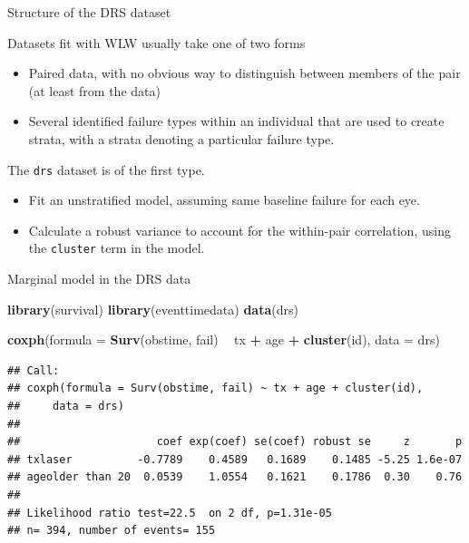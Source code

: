 \documentclass[ignorenonframetext,]{beamer}
\newenvironment{Shaded}{\begin{snugshade}}{\end{snugshade}}
\newcommand{\DataTypeTok}[1]{\textcolor[rgb]{0.13,0.29,0.53}{#1}}
\newcommand{\KeywordTok}[1]{\textcolor[rgb]{0.13,0.29,0.53}{\textbf{#1}}}
\newcommand{\NormalTok}[1]{#1}
\newcommand{\OperatorTok}[1]{\textcolor[rgb]{0.81,0.36,0.00}{\textbf{#1}}}
\newcommand{\StringTok}[1]{\textcolor[rgb]{0.31,0.60,0.02}{#1}}
\begin{document}
\begin{frame}{%
\protect\hypertarget{structure-of-the-drs-dataset}{%
Structure of the DRS dataset}}

Datasets fit with WLW usually take one of two forms

\begin{itemize}
\item
  Paired data, with no obvious way to distinguish between members of the
  pair (at least from the data)
\item
  Several identified failure types within an individual that are used to
  create strata, with a strata denoting a particular failure type.
\end{itemize}

The \texttt{drs} dataset is of the first type.

\begin{itemize}
\item
  Fit an unstratified model, assuming same baseline failure for each
  eye.
\item
  Calculate a robust variance to account for the within-pair
  correlation, using the \texttt{cluster} term in the model.
\end{itemize}

\end{frame}

\begin{frame}[fragile]{%
\protect\hypertarget{marginal-model-in-the-drs-data}{%
Marginal model in the DRS data}}

\scriptsize

\begin{Shaded}
\begin{Highlighting}[]
\KeywordTok{library}\NormalTok{(survival)}
\KeywordTok{library}\NormalTok{(eventtimedata)}
\KeywordTok{data}\NormalTok{(drs)}

\KeywordTok{coxph}\NormalTok{(}\DataTypeTok{formula =} \KeywordTok{Surv}\NormalTok{(obstime, fail) }\OperatorTok{~}\StringTok{ }\NormalTok{tx }\OperatorTok{+}\StringTok{ }\NormalTok{age }\OperatorTok{+}\StringTok{ }\KeywordTok{cluster}\NormalTok{(id),}
      \DataTypeTok{data =}\NormalTok{ drs)}
\end{Highlighting}
\end{Shaded}

\begin{verbatim}
## Call:
## coxph(formula = Surv(obstime, fail) ~ tx + age + cluster(id), 
##     data = drs)
## 
##                     coef exp(coef) se(coef) robust se     z       p
## txlaser          -0.7789    0.4589   0.1689    0.1485 -5.25 1.6e-07
## ageolder than 20  0.0539    1.0554   0.1621    0.1786  0.30    0.76
## 
## Likelihood ratio test=22.5  on 2 df, p=1.31e-05
## n= 394, number of events= 155
\end{verbatim}

\end{frame}
\end{document}
